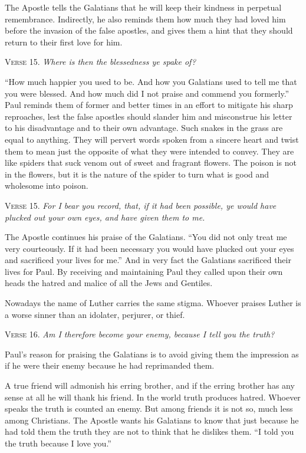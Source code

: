 The Apostle tells the Galatians that he will keep their kindness in perpetual remembrance. Indirectly, he also reminds them how much they had loved him before the invasion of the false apostles, and gives them a hint that they should return to their first love for him.

\textsc{Verse} 15. \emph{Where is then the blessedness ye spake of?}

“How much happier you used to be. And how you Galatians used to tell me that you were blessed. And how much did I not praise and commend you formerly.” Paul reminds them of former and better times in an effort to mitigate his sharp reproaches, lest the false apostles should slander him and misconstrue his letter to his disadvantage and to their own advantage. Such snakes in the grass are equal to anything. They will pervert words spoken from a sincere heart and twist them to mean just the opposite of what they were intended to convey. They are like spiders that suck venom out of sweet and fragrant flowers. The poison is not in the flowers, but it is the nature of the spider to turn what is good and wholesome into poison.

\textsc{Verse} 15. \emph{For I bear you record, that, if it had been possible, ye would have plucked out your own eyes, and have given them to me.}

The Apostle continues his praise of the Galatians. “You did not only treat me very courteously. If it had been necessary you would have plucked out your eyes and sacrificed your lives for me.” And in very fact the Galatians sacrificed their lives for Paul. By receiving and maintaining Paul they called upon their own heads the hatred and malice of all the Jews and Gentiles.

Nowadays the name of Luther carries the same stigma. Whoever praises Luther is a worse sinner than an idolater, perjurer, or thief.

\textsc{Verse} 16. \emph{Am I therefore become your enemy, because I tell you the truth?}

Paul’s reason for praising the Galatians is to avoid giving them the impression as if he were their enemy because he had reprimanded them.

A true friend will admonish his erring brother, and if the erring brother has any sense at all he will thank his friend. In the world truth produces hatred. Whoever speaks the truth is counted an enemy. But among friends it is not so, much less among Christians. The Apostle wants his Galatians to know that just because he had told them the truth they are not to think that he dislikes them. “I told you the truth because I love you.”

